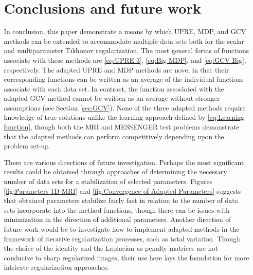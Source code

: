 \documentclass[12pt]{article}
\begin{document}
\section{Conclusions and future work} \label{sec:Conclusion}
In conclusion, this paper demonstrate a means by which UPRE, MDP, and GCV methods can be extended to accommodate multiple data sets both for the scalar and multiparameter Tikhonov regularization. The most general forms of functions associate with these methods are \eqref{eq:UPRE 3}, \eqref{eq:Big MDP}, and \eqref{eq:GCV Big}, respectively. The adapted UPRE and MDP methods are novel in that their corresponding functions can be written as an average of the individual functions associate with each data set. In contrast, the function associated with the adapted GCV method cannot be written as an average without stronger assumptions (see Section \ref{sec:GCV}). None of the three adapted methods require knowledge of true solutions unlike the learning approach defined by \eqref{eq:Learning function}, though both the MRI and MESSENGER test problems demonstrate that the adapted methods can perform competitively depending upon the problem set-up. \par
There are various directions of future investigation. Perhaps the most significant results could be obtained through approaches of determining the necessary number of data sets for a stabilization of selected parameters. Figures \ref{fig:Parameters 1D MRI} and \ref{fig:Convergence of Adapted Parameters} suggests that obtained parameters stabilize fairly fast in relation to the number of data sets incorporate into the method functions, though there can be issues with minimization in the direction of additional parameters. Another direction of future work would be to investigate how to implement adapted methods in the framework of iterative regularization processes, such as total variation. Though the choice of the identity and the Laplacian as penalty matrices are not conducive to sharp regularized images, their use here lays the foundation for more intricate regularization approaches.



\end{document}
